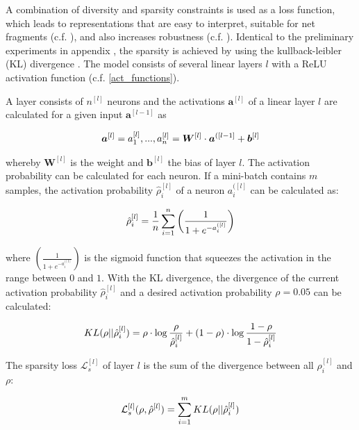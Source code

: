 A combination of diversity and sparsity constraints is used as a loss function, which leads to representations that are easy to interpret, suitable for net fragments (c.f. ), and also increases robustness (c.f. ).
Identical to the preliminary experiments in appendix , the sparsity is achieved by using the kullback-leibler (KL) divergence .
The model consists of several linear layers $l$ with a ReLU activation function (c.f. \eqref{act_functions}).

A layer consists of $n^{[l]}$ neurons and the activations $\boldsymbol{a}^{[l]}$ of a linear layer $l$ are calculated for a given input $\boldsymbol{a}^{[l-1]}$ as

\begin{align}\eqlbl{vso_1}
		\boldsymbol{a}^{[l]} = a^{[l]}_1, ..., a^{[l]}_n = \boldsymbol{W}^{[l]} \cdot \boldsymbol{a}^{([l-1]} + \boldsymbol{b}^{[l]}
\end{align}

whereby $\boldsymbol{W}^{[l]}$ is the weight and $\boldsymbol{b}^{[l]}$ the bias of layer $l$.
The activation probability can be calculated for each neuron. If a mini-batch contains $m$ samples, the activation probability $\hat{\rho}^{[l]}_i$ of a neuron $a^{([l]}_i$ can be calculated as:

\begin{align}\eqlbl{vso_2}
		\hat{\rho}^{[l]}_i= \frac{1}{n} \sum^n_{i=1} \left( \frac{1}{1+e^{-a^{([l]}_i}} \right)
\end{align}

where $\left( \frac{1}{1+e^{-a^{([l]}_i}} \right)$ is the sigmoid function that squeezes the activation in the range between $0$ and $1$.
With the KL divergence, the divergence of the current activation probability $\hat{\rho}^{[l]}_i$ and a desired activation probability $\rho=0.05$ can be calculated:

\begin{align}\eqlbl{vso_3}
		KL(\rho || \hat{\rho}^{[l]}_i) = \rho \cdot \log \frac{\rho}{\hat{\rho}^{[l]}_i} + (1-\rho) \cdot \log \frac{1-\rho}{1-\hat{\rho}^{[l]}_i}
\end{align}

The sparsity loss $\mathcal{L}^{[l]}_{s}$ of layer $l$ is the sum of the divergence between all $\hat{\rho}^{[l]}_i$ and $\rho$:

\begin{align}\eqlbl{vso_4}
		\mathcal{L}^{[l]}_{s}(\rho, \hat{\rho}^{[l]}) = \sum_{i=1}^{m} KL(\rho || \hat{\rho}^{[l]}_i)
\end{align}


